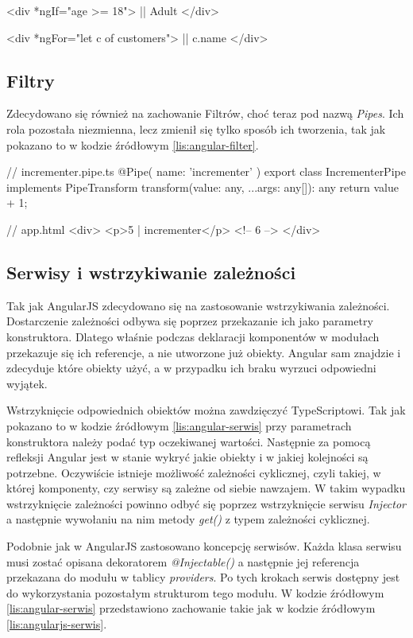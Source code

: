 	\begin{code}[
		language=javascript,
		caption={Użycie wbudowanych dyrektyw strukturalnych w Angularze (źródło: opracowanie własne)},
		label={lis:angular-structural-directives},
		escapechar=|
	]
<div *ngIf="age >= 18"> |\label{line:angular-ngif}|
  Adult
</div>

<div *ngFor="let c of customers"> |\label{line:angular-ngfor}|
  {{c.name}}
</div>
	\end{code}
	
	\subsection{Filtry}
	Zdecydowano się również na zachowanie Filtrów, choć teraz pod nazwą \textit{Pipes}. Ich rola pozostała niezmienna, lecz zmienił się tylko sposób ich tworzenia, tak jak pokazano to w kodzie źródłowym \ref{lis:angular-filter}.
	
	\begin{code}[
		language=javascript,
		caption={Utworzenie i użycie filtru w Angularze (źródło: opracowanie własne)},
		label={lis:angular-filter}
	]
// incrementer.pipe.ts
@Pipe({
  name: 'incrementer'
})
export class IncrementerPipe implements PipeTransform {
  transform(value: any, ...args: any[]): any {
    return value + 1;
  }
}

// app.html
<div>
	<p>{{5 | incrementer}}</p> <!-- 6 -->
</div>
	\end{code} 

	\subsection{Serwisy i wstrzykiwanie zależności}
	Tak jak AngularJS zdecydowano się na zastosowanie wstrzykiwania zależności. Dostarczenie zależności odbywa się poprzez przekazanie ich jako parametry konstruktora. Dlatego właśnie podczas deklaracji komponentów w modułach przekazuje się ich referencje, a nie utworzone już obiekty. Angular sam znajdzie i zdecyduje które obiekty użyć, a w przypadku ich braku wyrzuci odpowiedni wyjątek.\par
	Wstrzyknięcie odpowiednich obiektów można zawdzięczyć TypeScriptowi. Tak jak pokazano to w kodzie źródłowym \ref{lis:angular-serwis} przy parametrach konstruktora należy podać typ oczekiwanej wartości. Następnie za pomocą refleksji Angular jest w stanie wykryć jakie obiekty i w jakiej kolejności są potrzebne. Oczywiście istnieje możliwość zależności cyklicznej, czyli takiej, w której komponenty, czy serwisy są zależne od siebie nawzajem. W takim wypadku wstrzyknięcie zależności powinno odbyć się poprzez wstrzyknięcie serwisu \textit{Injector} a następnie wywołaniu na nim metody \textit{get()} z typem zależności cyklicznej.\par
	Podobnie jak w AngularJS zastosowano koncepcję serwisów. Każda klasa serwisu musi zostać opisana dekoratorem \textit{@Injectable()} a następnie jej referencja przekazana do modułu w tablicy \textit{providers}. Po tych krokach serwis dostępny jest do wykorzystania pozostałym strukturom tego modułu. W kodzie źródłowym \ref{lis:angular-serwis} przedstawiono zachowanie takie jak w kodzie źródłowym \ref{lis:angularjs-serwis}. 
	
